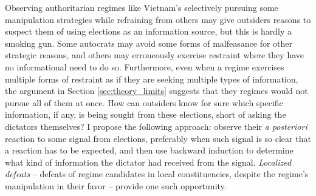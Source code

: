 \documentclass[12pt]{article}
\newcommand{\1}{\mathbbm{1}}
\begin{document}
Observing authoritarian regimes like Vietnam’s selectively pursuing some manipulation strategies while refraining from others may give outsiders reasons to suspect them of using elections as an information source, but this is hardly a smoking gun. Some autocrats may avoid some forms of malfeasance for other strategic reasons, and others may erroneously exercise restraint where they have no informational need to do so. Furthermore, even when a regime exercises multiple forms of restraint as if they are seeking multiple types of information, the argument in Section \ref{sec:theory_limits} suggests that they regimes would not pursue all of them at once. How can outsiders know for sure which specific information, if any, is being sought from these elections, short of asking the dictators themselves?  I propose the following approach: observe their \textit{a posteriori} reaction to some signal from elections, preferably when such signal is so clear that a reaction has to be expected, and then use backward induction to determine what kind of information the dictator had received from the signal. \textit{Localized defeats} -- defeats of regime candidates in local constituencies, despite the regime's manipulation in their favor -- provide one such opportunity.

\end{document}
